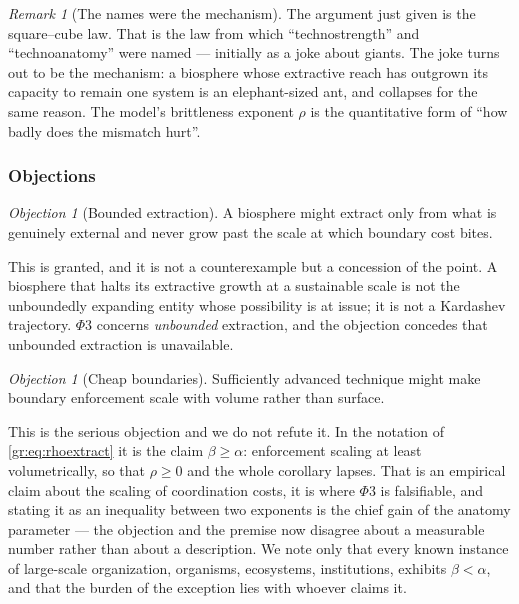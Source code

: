 \documentclass[11pt]{article}
\numberwithin{equation}{section}
\theoremstyle{plain}
\theoremstyle{definition}
\theoremstyle{remark}
\newtheorem{remark}[theorem]{Remark}
\newtheorem{objection}[theorem]{Objection}
\begin{document}
\begin{remark}[The names were the mechanism]\label{gr:rem:namesclosure}
The argument just given is the square--cube law. That is the law from
which ``technostrength'' and ``technoanatomy'' were named --- initially
as a joke about giants. The joke turns out to be the mechanism: a
biosphere whose extractive reach has outgrown its capacity to remain one
system is an elephant-sized ant, and collapses for the same reason. The
model's brittleness exponent $\rho$ is the quantitative form of ``how
badly does the mismatch hurt''.
\end{remark}

\subsubsection{Objections}\label{gr:subsub:objections}

\begin{objection}[Bounded extraction]\label{gr:obj:bounded}
A biosphere might extract only from what is genuinely external and never
grow past the scale at which boundary cost bites.
\end{objection}

\noindent This is granted, and it is not a counterexample but a
concession of the point. A biosphere that halts its extractive growth at
a sustainable scale is not the unboundedly expanding entity whose
possibility is at issue; it is not a Kardashev trajectory. $\Phi3$
concerns \emph{unbounded} extraction, and the objection concedes that
unbounded extraction is unavailable.

\begin{objection}[Cheap boundaries]\label{gr:obj:cheap}
Sufficiently advanced technique might make boundary enforcement scale
with volume rather than surface.
\end{objection}

\noindent This is the serious objection and we do not refute it. In the
notation of \eqref{gr:eq:rhoextract} it is the claim $\beta\ge\alpha$:
enforcement scaling at least volumetrically, so that $\rho\ge0$ and the
whole corollary lapses. That is an empirical claim about the scaling of
coordination costs, it is where $\Phi3$ is falsifiable, and stating it
as an inequality between two exponents is the chief gain of the anatomy
parameter --- the objection and the premise now disagree about a
measurable number rather than about a description. We note only that
every known instance of large-scale organization, organisms,
ecosystems, institutions, exhibits $\beta<\alpha$, and that the
burden of the exception lies with whoever claims it.
\end{document}
